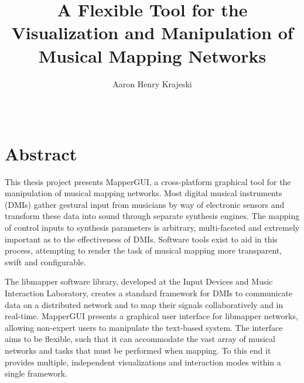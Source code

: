 \documentclass [12pt,letterpaper]{report}
\begin{document}

\title{A Flexible Tool for the Visualization and Manipulation of Musical Mapping Networks}
\author{Aaron Henry Krajeski}
\date{\Month\ \number\year}

\maketitle

\raggedbottom
\onehalfspacing
{}

\section*{\centering Abstract}

This thesis project presents MapperGUI, a cross-platform graphical tool for the manipulation of musical mapping networks. Most digital musical instruments (DMIs) gather gestural input from musicians by way of electronic sensors and transform these data into sound through separate synthesis engines. The mapping of control inputs to synthesis parameters is arbitrary, multi-faceted and extremely important as to the effectiveness of DMIs. Software tools exist to aid in this process, attempting to render the task of musical mapping more transparent, swift and configurable. 

The libmapper software library, developed at the Input Devices and Music Interaction Laboratory, creates a standard framework for DMIs to communicate data on a distributed network and to map their signals collaboratively and in real-time. MapperGUI presents a graphical user interface for libmapper networks, allowing non-expert users to manipulate the text-based system. The interface aims to be flexible, such that it can accommodate the vast array of musical networks and tasks that must be performed when mapping. To this end it provides multiple, independent visualizations and interaction modes within a single framework. 
\end{document}
